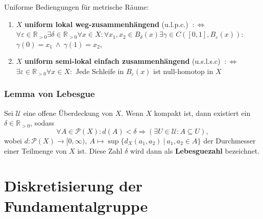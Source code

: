 \documentclass[12pt, aspectratio=169]{beamer}
\newcommand{\R}[0]{\mathbb{R}}
\begin{document}
\begin{frame}
Uniforme Bediengungen für metrische Räume:    
\begin{definition}
    \begin{enumerate}
        \item $X$ \textbf{uniform lokal weg-zusammenhängend} (u.l.p.c.) $\: :\Longleftrightarrow$ \\ $\forall \varepsilon \in \R_{>0} \exists \delta \in \R_{>0}\forall x \in X\colon \forall x_1, x_2 \in B_{\delta}(x)\exists \gamma \in C([0,1], B_{\varepsilon}(x))\colon$ \\ $\gamma(0) = x_1 \: \land \: \gamma(1) = x_2$,
        \item $X$ \textbf{uniform semi-lokal einfach zusammenhängend} (u.s.l.s.c) $\: :\Longleftrightarrow$ \\ $\exists \varepsilon \in \R_{>0}\forall x\in X\colon$ Jede Schleife in $B_{\varepsilon}(x)$ ist null-homotop in $X$
        \end{enumerate}
\end{definition}
\end{frame}

\begin{frame} \frametitle{Lemma von Lebesgue}
    \begin{lemma}
        Sei $\mathcal{U}$ eine offene Überdeckung von $X$. Wenn $X$ kompakt ist, dann existiert ein $\delta \in \R_{>0}$, sodass
        \begin{equation*}
          \forall A \in \mathcal{P}(X)\colon d(A) < \delta \Rightarrow (\exists U \in \mathcal{U}\colon A \subseteq U),
        \end{equation*}
        wobei $d\colon \mathcal{P}(X) \to [0, \infty), \: A \mapsto \sup \{ d_X(a_1, a_2) \: | \: a_1,a_2\in A \}$ der Durchmesser einer Teilmenge von $X$ ist.
        Diese Zahl $\delta$ wird dann als \textbf{Lebesguezahl} bezeichnet.
    \end{lemma}
\end{frame}

\section{Diskretisierung der Fundamentalgruppe}
\end{document}
